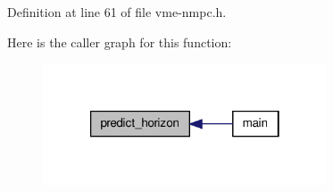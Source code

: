 Definition at line 61 of file vme-\/nmpc.\-h.



Here is the caller graph for this function\-:
\nopagebreak
\begin{figure}[H]
\begin{center}
\leavevmode
\includegraphics[width=238pt]{vme-nmpc_8h_a293565f06dcf7e375ac1b53f3b9b0a0b_icgraph}
\end{center}
\end{figure}


